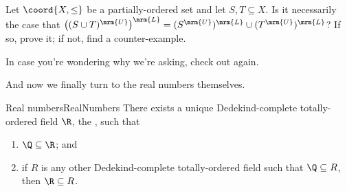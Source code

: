 \begin{exr}{}{}
Let $\coord{X,\leq}$ be a partially-ordered set and let $S,T\subseteq X$.  Is it necessarily the case that $\left( (S\cup T)^{\mrm{U}}\right) ^{\mrm{L}}=(S^{\mrm{U}})^{\mrm{L}}\cup (T^{\mrm{U}})^{\mrm{L}}$?  If so, prove it; if not, find a counter-example.
\begin{rmk}
In case you're wondering why we're asking, check out  again.
\end{rmk}
\end{exr}

And now we finally turn to the real numbers themselves.
\begin{thm}{Real numbers}{RealNumbers}
There exists a unique Dedekind-complete totally-ordered field $\R$, the , such that
\begin{enumerate}
\item $\Q \subseteq \R$; and
\item if $R$ is any other Dedekind-complete totally-ordered field such that $\Q \subseteq R$, then $\R \subseteq R$.
\end{enumerate}


\end{thm}

